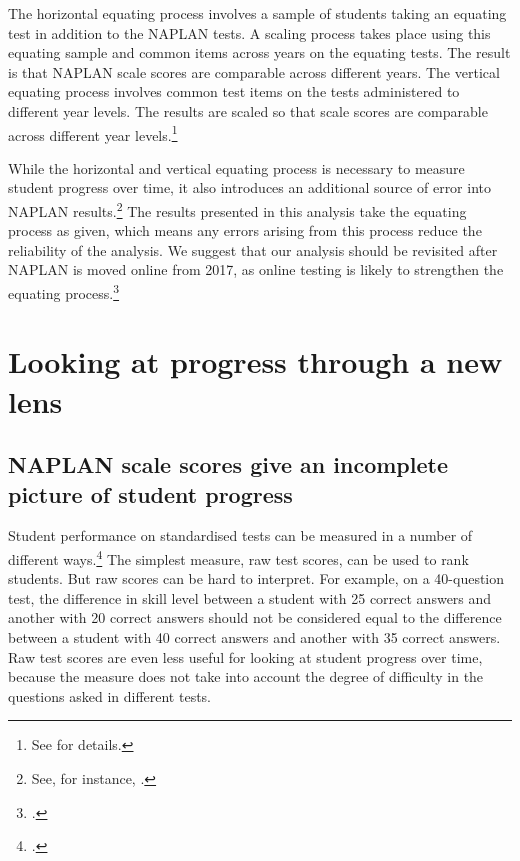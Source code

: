The horizontal equating process involves a sample of students taking an equating test in addition to the NAPLAN tests. A scaling process takes place using this equating sample and common items across years on the equating tests. The result is that NAPLAN scale scores are comparable across different years. The vertical equating process involves common test items on the tests administered to different year levels. The results are scaled so that scale scores are comparable across different year levels.\footnote{See \textcite[][40--72]{acara2015a} for details.}

While the horizontal and vertical equating process is necessary to measure student progress over time, it also introduces an additional source of error into NAPLAN results.\footnote{See, for instance, \textcite{wu2010}.} The results presented in this analysis take the equating process as given, which means any errors arising from this process reduce the reliability of the analysis. We suggest that our analysis should be revisited after NAPLAN is moved online from 2017, as online testing is likely to strengthen the equating process.\footcite{acara2015b,wu2010}

\section{Looking at progress through a new lens}

\subsection{NAPLAN scale scores give an incomplete picture of student progress}

Student performance on standardised tests can be measured in a number of different ways.\footcite{angoff1984} The simplest measure, raw test scores, can be used to rank students. But raw scores can be hard to interpret. For example, on a 40-question test, the difference in skill level between a student with 25 correct answers and another with 20 correct answers should not be considered equal to the difference between a student with 40 correct answers and another with 35 correct answers. Raw test scores are even less useful for looking at student progress over time, because the measure does not take into account the degree of difficulty in the questions asked in different tests.

